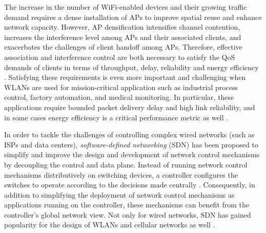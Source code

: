 The increase in the number of WiFi-enabled devices and their growing traffic demand requires a dense installation of APs to improve spatial reuse and enhance network capacity. 
However, AP densification intensifies channel contention, increases the interference level among APs and their associated clients, and exacerbates the challenges of client handoff among APs. 
Therefore, effective association and interference control are both necessary to satisfy the QoS demands of clients in terms of throughput, delay, reliability and energy efficiency \cite{largeScaleMeas,DenseAP,DenseWLAN2,APdensity,QoS-WLANs}. 
Satisfying these requirements is even more important and challenging when WLANs are used for mission-critical application such as industrial process control, factory automation, and medical monitoring.
In particular, these applications require bounded packet delivery delay and high link reliability, and in some cases energy efficiency is a critical performance metric as well \cite{tramarin2016use,REWIMO}.


%
%

In order to tackle the challenges of controlling complex wired networks (such as ISPs and data centers), \textit{software-defined networking} (SDN) has been proposed to simplify and improve the design and development of network control mechanisms by decoupling the control and data plane.
Instead of running network control mechanisms distributively on switching devices, a controller configures the switches to operate according to the decisions made centrally \cite{SDN1,SDN2}. 
Consequently, in addition to simplifying the deployment of network control mechanisms as applications running on the controller, these mechanisms can benefit from the controller's global network view.
Not only for wired networks, SDN has gained popularity for the design of WLANs and cellular networks as well \cite{SDNcellular,Crowd, mSDN2,SDNsurvey}.



